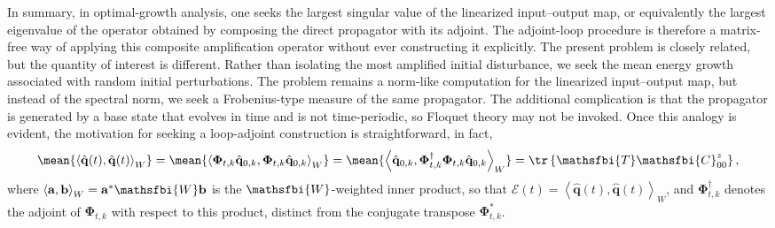 In summary, in optimal-growth analysis, one seeks the largest singular value of the linearized input--output map, or equivalently the largest eigenvalue of the operator obtained by composing the direct propagator with its adjoint. The adjoint-loop procedure is therefore a matrix-free way of applying this composite amplification operator without ever constructing it explicitly. The present problem is closely related, but the quantity of interest is different. Rather than isolating the most amplified initial disturbance, we seek the mean energy growth associated with random initial perturbations. The problem remains a norm-like computation for the linearized input--output map, but instead of the spectral norm, we seek a Frobenius-type measure of the same propagator. The additional complication is that the propagator is generated by a base state that evolves in time and is not time-periodic, so Floquet theory may not be invoked. Once this analogy is evident, the motivation for seeking a loop-adjoint construction is straightforward, in fact,
\begin{equation}
    \mean{
      \left\langle\hat{\mathbf{q}}(t),\hat{\mathbf{q}}(t)\right\rangle_{W}
    }
    =
    \mean{
      \left\langle
        \boldsymbol{\Phi}_{t,k}\hat{\mathbf{q}}_{0,k},
        \boldsymbol{\Phi}_{t,k}\hat{\mathbf{q}}_{0,k}
      \right\rangle_{W}
    }
    =
    \mean{
      \left\langle
        \hat{\mathbf{q}}_{0,k},
        \boldsymbol{\Phi}_{t,k}^{\dagger}\boldsymbol{\Phi}_{t,k}\hat{\mathbf{q}}_{0,k}
      \right\rangle_{W}
    }
    =
    \tr\left\{
      \mathsfbi{T}\mathsfbi{C}_{00}^{z}
    \right\},
    \label{eq:expectation_to_trace}
\end{equation}
where \(\left\langle\mathbf{a},\mathbf{b}\right\rangle_{W}=\mathbf{a}^{*}\mathsfbi{W}\mathbf{b}\) is the \(\mathsfbi{W}\)-weighted inner product, so that \(\mathcal{E}(t)=\left\langle\hat{\mathbf{q}}(t),\hat{\mathbf{q}}(t)\right\rangle_{W}\), and \(\boldsymbol{\Phi}_{t,k}^{\dagger}\) denotes the adjoint of \(\boldsymbol{\Phi}_{t,k}\) with respect to this product, distinct from the conjugate transpose \(\boldsymbol{\Phi}_{t,k}^{*}\).




